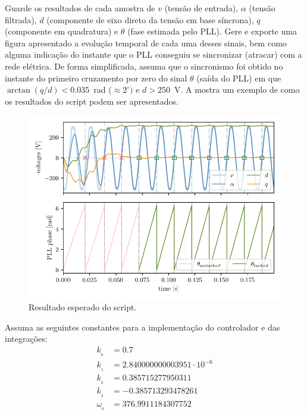 Guarde os resultados de cada amostra de $v$ (tensão de entrada), $\alpha$ (tensão filtrada), $d$ (componente de eixo
direto da tensão em base síncrona), $q$ (componente em quadratura) e $\theta$ (fase estimada pelo PLL).
Gere e exporte uma figura apresentado a evolução temporal de cada uma desses sinais, bem como alguma indicação do
instante que o PLL conseguiu se sincronizar (atracar) com a rede elétrica.
De forma simplificada, assuma que o sincronismo foi obtido no instante do primeiro cruzamento por zero do sinal
$\theta$ (saída do PLL) em que
$\arctan(q/d) < 0.035$~rad ($\approx 2^\circ)$ e $d > 250$~V.
A  mostra um exemplo de como os resultados do script podem ser
apresentados.
\begin{figure}[htbp]
    \centering
    \includegraphics[scale=1.0]{figs/plot_pll}
    \caption{Resultado esperado do script.}
    \label{fig:plot}
\end{figure}

Assuma as seguintes constantes para a implementação do controlador e das integrações:
\begin{equation}\label{eq:cont}
    \begin{aligned}
        k_{_0} &= 0.7 \\
        k_{_1} &= 2.840000000003951\cdot 10^{-6} \\
        k_{_2} &= 0.385715277950311 \\
        k_{_3} &= -0.385713293478261 \\
        \omega_{_0} &= 376.9911184307752
    \end{aligned}
\end{equation}



